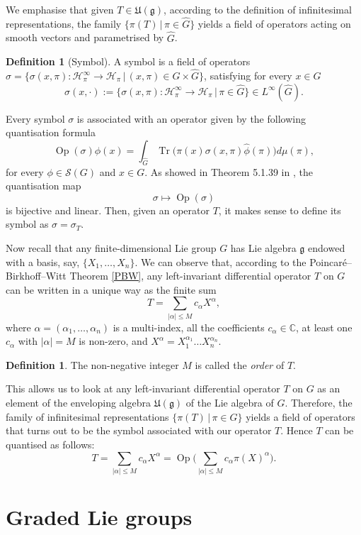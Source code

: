 \documentclass[12pt,oneside,a4paper]{book}
\numberwithin{equation}{section}     %
\theoremstyle{plain}
\theoremstyle{definition}
\newtheorem{definition}[theorem]{Definition}
\DeclareMathOperator{\Tr}{Tr}
\DeclareMathOperator{\Op}{Op}
\newcommand{\C}{{\mathbb C}}
\begin{document}
We emphasise that given $T\in\mathfrak{U}(\mathfrak{g})$, according to the definition of infinitesimal representations, the family $\{\pi(T)\,|\,\pi\in\widehat{G}\}$ yields a field of operators acting on smooth vectors and parametrised by $\widehat{G}$.

\begin{definition}[Symbol]\label{symbol}
	A symbol is a field of operators $\sigma=\big\{\sigma (x,\pi):\mathcal H_\pi^\infty\rightarrow\mathcal H_\pi\,|\,(x,\pi)\in G\times\widehat G\big\}$, satisfying for every $x\in G$
	\[
	\sigma(x,\cdot):=\{ \sigma(x,\pi): \mathcal H_\pi^\infty\rightarrow\mathcal H_\pi\,|\,\pi\in\widehat G\}\in L^\infty(\widehat G).
	\]
\end{definition}
Every symbol $\sigma$ is associated with an operator given by the following quantisation formula
\[
\Op(\sigma)\phi(x)=\int_{\widehat G}\Tr\big(\pi(x)\sigma(x,\pi)\widehat\phi(\pi)\big) d\mu(\pi),
\]
for every $\phi\in\mathcal S(G)$ and $x\in G$. As showed in Theorem 5.1.39 in \cite{FR2016}, the quantisation map
\[
\sigma\mapsto \Op(\sigma)
\]
is bijective and linear. Then, given an operator $T$, it makes sense to define its symbol as $\sigma=\sigma_T$. 

Now recall that any finite-dimensional Lie group $G$ has Lie algebra $\mathfrak{g}$ endowed with a basis, say, $\{X_1,\ldots,X_n\}$. We can observe that, according to the Poincar\'e--Birkhoff--Witt Theorem \ref{PBW}, any left-invariant differential operator $T$ on $G$ can be written in a unique way as the finite sum
\[
T=\sum_{|\alpha|\leq M}c_\alpha X^\alpha,
\]
where $\alpha=(\alpha_1,\ldots,\alpha_n)$ is a multi-index, all the coefficients $c_\alpha\in\C$, at least one $c_\alpha$ with $|\alpha|=M$ is non-zero, and $X^\alpha=X_1^{\alpha_1}\dots X_n^{\alpha_n}$.
\begin{definition}
	The non-negative integer $M$ is called the \textit{order} of $T$.
\end{definition}
This allows us to look at any left-invariant differential operator $T$ on $G$ as an element of the enveloping algebra $\mathfrak U(\mathfrak g)$ of the Lie algebra of $G$. Therefore, the family of infinitesimal representations $\{\pi(T)\,|\,\pi\in\widehat G \}$ yields a field of operators that turns out to be the symbol associated with our operator $T$. Hence $T$ can be quantised as follows:
\[
T=\sum_{|\alpha|\leq M}c_\alpha X^\alpha=\Op\Bigg(\sum_{|\alpha|\leq M}c_\alpha\pi(X)^\alpha\Bigg).
\]

\section{Graded Lie groups}\label{Sec:gradedLiegroup}
\end{document}

